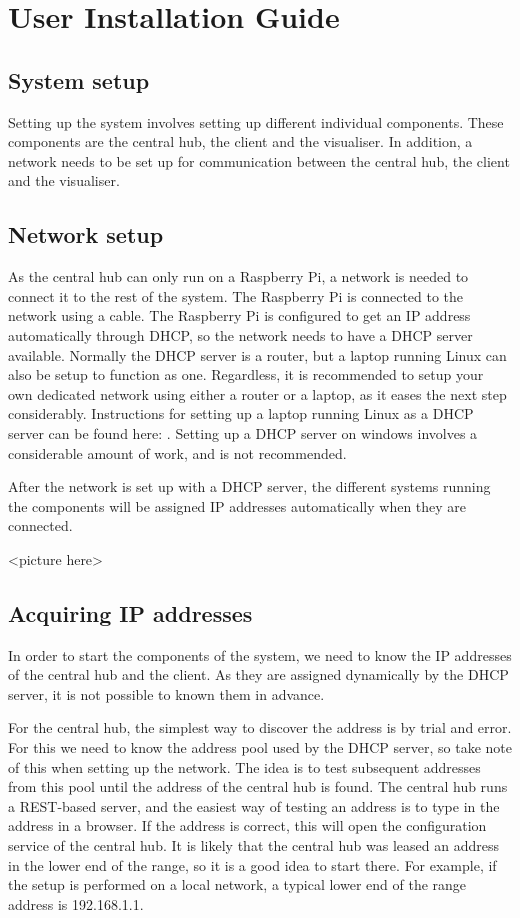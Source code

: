 \documentclass[../document.tex]{subfiles}
\begin{document}
\section{User Installation Guide}

\subsection{System setup}
Setting up the system involves setting up different individual components. These components are the central hub, the client and the visualiser. In addition, a network needs to be set up for communication between the central hub, the client and the visualiser.

\subsection{Network setup}
As the central hub can only run on a Raspberry Pi, a network is needed to connect it to the rest of the system. The Raspberry Pi is connected to the network using a cable. The Raspberry Pi is configured to get an IP address automatically through DHCP, so the network needs to have a DHCP server available. Normally the DHCP server is a router, but a laptop running Linux can also be setup to function as one. Regardless, it is recommended to setup your own dedicated network using either a router or a laptop, as it eases the next step considerably. Instructions for setting up a laptop running Linux as a DHCP server can be found here:
	.
Setting up a DHCP server on windows involves a considerable amount of work, and is not recommended.

After the network is set up with a DHCP server, the different systems running the components will be assigned IP addresses automatically when they are connected.

{\color{red} <picture here>}

\subsection{Acquiring IP addresses}
In order to start the components of the system, we need to know the IP addresses of the central hub and the client. As they are assigned dynamically by the DHCP server, it is not possible to known them in advance.

For the central hub, the simplest way to discover the address is by trial and error. For this we need to know the address pool used by the DHCP server, so take note of this when setting up the network. The idea is to test subsequent addresses from this pool until the address of the central hub is found. The central hub runs a REST-based server, and the easiest way of testing an address is to type in the address in a browser. If the address is correct, this will open the configuration service of the central hub. It is likely that the central hub was leased an address in the lower end of the range, so it is a good idea to start there. For example, if the setup is performed on a local network, a typical lower end of the range address is 192.168.1.1.
\end{document}
